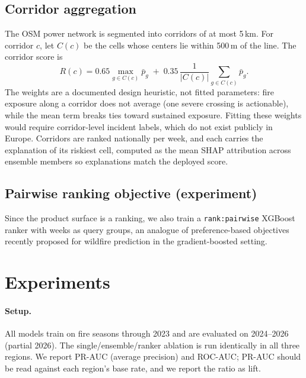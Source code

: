 \documentclass[11pt]{article}
\begin{document}
\subsection{Corridor aggregation}

The OSM power network is segmented into corridors of at most 5\,km. For
corridor $c$, let $C(c)$ be the cells whose centers lie within 500\,m of the
line. The corridor score is
\begin{equation}
  R(c) = 0.65 \max_{g \in C(c)} \bar{p}_{g} \;+\; 0.35 \,
  \frac{1}{|C(c)|}\sum_{g \in C(c)} \bar{p}_{g}.
  \label{eq:corridor}
\end{equation}
The weights are a documented design heuristic, not fitted parameters: fire
exposure along a corridor does not average (one severe crossing is
actionable), while the mean term breaks ties toward sustained exposure.
Fitting these weights would require corridor-level incident labels, which do
not exist publicly in Europe. Corridors are ranked nationally per week, and
each carries the explanation of its riskiest cell, computed as the mean SHAP
attribution across ensemble members so explanations match the deployed score.

\subsection{Pairwise ranking objective (experiment)}

Since the product surface is a ranking, we also train a
\texttt{rank:pairwise} XGBoost ranker with weeks as query groups, an
analogue of preference-based objectives recently proposed for wildfire
prediction \citep{jiang2026eapo} in the gradient-boosted setting.

\section{Experiments}
\label{sec:experiments}

\paragraph{Setup.} All models train on fire seasons through 2023 and are
evaluated on 2024--2026 (partial 2026). The single/ensemble/ranker ablation
is run identically in all three regions. We report PR-AUC (average
precision) and ROC-AUC; PR-AUC should be read against each region's base
rate, and we report the ratio as lift.
\end{document}
